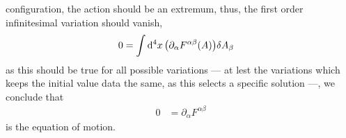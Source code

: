 configuration, the action should be an extremum, thus, the first order infinitesimal variation should vanish,
\begin{align}
    0&= \int\dd[4]{x}\qty(\partial_\alpha F^{\alpha\beta}\qty(A))\delta A_\beta
\end{align}
as this should be true for all possible variations --- at lest the variations which keeps the initial value data the same, as this selects a specific 
solution ---, we conclude that
\begin{align}
    0&=\partial_\alpha F^{\alpha\beta}
\end{align}
is the equation of motion.


\probitem{}

